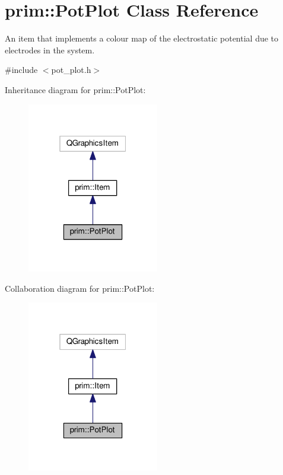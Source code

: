 \hypertarget{classprim_1_1PotPlot}{}\section{prim\+:\+:Pot\+Plot Class Reference}
\label{classprim_1_1PotPlot}


An item that implements a colour map of the electrostatic potential due to electrodes in the system.  




{\ttfamily \#include $<$pot\+\_\+plot.\+h$>$}



Inheritance diagram for prim\+:\+:Pot\+Plot\+:\nopagebreak
\begin{figure}[H]
\begin{center}
\leavevmode
\includegraphics[width=163pt]{classprim_1_1PotPlot__inherit__graph}
\end{center}
\end{figure}


Collaboration diagram for prim\+:\+:Pot\+Plot\+:\nopagebreak
\begin{figure}[H]
\begin{center}
\leavevmode
\includegraphics[width=163pt]{classprim_1_1PotPlot__coll__graph}
\end{center}
\end{figure}
